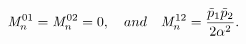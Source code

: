 \begin{equation}
{\mathit {M} }^{01}_{n} = {\mathit {M} }^{02}_{n}= 0  
,~~~and~~~ {\mathit {M} }^{12}_{n}= \frac {\tilde p_1\tilde p_2}{2\alpha^2}. \\
\end{equation}

